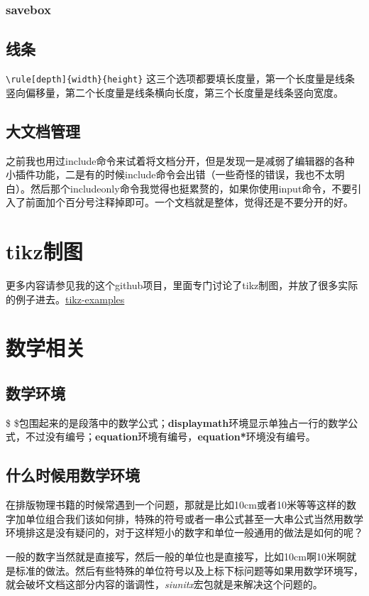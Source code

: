 \documentclass[12pt,oneside]{book}
\begin{document}
\begin{common-format}
\subsection{savebox}


\section{线条}
\verb+\rule[depth]{width}{height}+
这三个选项都要填长度量，第一个长度量是线条竖向偏移量，第二个长度量是线条横向长度，第三个长度量是线条竖向宽度。

\section{大文档管理}
之前我也用过include命令来试着将文档分开，但是发现一是减弱了编辑器的各种小插件功能，二是有的时候include命令会出错（一些奇怪的错误，我也不太明白）。然后那个includeonly命令我觉得也挺累赘的，如果你使用input命令，不要引入了前面加个百分号注释掉即可。一个文档就是整体，觉得还是不要分开的好。


\chapter{tikz制图}
更多内容请参见我的这个github项目，里面专门讨论了tikz制图，并放了很多实际的例子进去。\href{https://github.com/a358003542/tikz-examples}{tikz-examples}




\chapter{数学相关}


\section{数学环境}
\$ \$包围起来的是段落中的数学公式；\textbf{displaymath}环境显示单独占一行的数学公式，不过没有编号；\textbf{equation}环境有编号，\textbf{equation*}环境没有编号。

\section{什么时候用数学环境}
在排版物理书籍的时候常遇到一个问题，那就是比如10cm或者10米等等这样的数字加单位组合我们该如何排，特殊的符号或者一串公式甚至一大串公式当然用数学环境排这是没有疑问的，对于这样短小的数字和单位一般通用的做法是如何的呢？

一般的数字当然就是直接写，然后一般的单位也是直接写，比如10cm啊10米啊就是标准的做法。然后有些特殊的单位符号以及上标下标问题等如果用数学环境写，就会破坏文档这部分内容的谐调性，\emph{siunitx}宏包就是来解决这个问题的。


\end{common-format}
\end{document}
